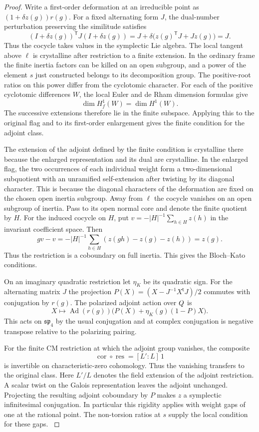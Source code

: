 \begin{proof}
Write a first-order deformation at an
irreducible point as \((1+\delta z(g))r(g)\).
For a fixed alternating form \(J\), the dual-number perturbation preserving the similitude satisfies
\[
 (I+\delta z(g))^{\mathsf T}J(I+\delta z(g))
 =J+\delta\bigl(z(g)^{\mathsf T}J+Jz(g)\bigr)=J .
\]
Thus the cocycle takes values in the symplectic Lie algebra. The local tangent above \(\ell\) is crystalline
after restriction to a finite extension. In the ordinary
frame the finite inertia factors can be killed on an open
subgroup, and a power of the element \(s\) just constructed
belongs to its decomposition group. The positive-root ratios
on this power differ from the cyclotomic character. For each of the positive cyclotomic differences \(W\), the
local Euler and de Rham dimension formulas give
\[
                         \dim H^1_f(W)=\dim H^1(W).
\]
The successive extensions therefore lie in the finite subspace. Applying this to the original flag and
to its first-order enlargement gives the finite condition for
the adjoint class.

The extension of the adjoint defined by
the finite condition is crystalline there because the
enlarged representation and its dual are crystalline. In
the enlarged flag, the two occurrences of each individual
weight form a two-dimensional subquotient with an
unramified self-extension after twisting by its diagonal
character. This is because the diagonal characters of the
deformation are fixed on the chosen open inertia subgroup.
Away from \(\ell\) the cocycle vanishes on an open subgroup of inertia. Pass to its open normal core and denote the finite quotient by \(H\). For the induced cocycle on \(H\), put \(v=-|H|^{-1}\sum_{h\in H}z(h)\) in the invariant coefficient space. Then
\[
 g v-v=-|H|^{-1}\sum_{h\in H}(z(gh)-z(g)-z(h))=z(g).
\]
Thus the restriction is a coboundary on full inertia. This gives the Bloch--Kato conditions.

On an imaginary quadratic restriction let \(\eta_K\) be
its quadratic sign. For the alternating matrix \(J\) the
projection \(P(X)=(X-J^{-1}X^{\mathsf t}J)/2\) commutes with
conjugation by \(r(g)\). The polarized adjoint action over
\(Q\) is
\[
        X\longmapsto
        \operatorname{Ad}(r(g))\big(P(X)+\eta_K(g)(1-P)X\big).
\]
This acts on \(\mathfrak{sp}_4\) by the usual conjugation and
at complex conjugation is negative transpose relative to the
polarizing pairing.

For the finite CM restriction at which the adjoint group
vanishes, the composite
\[
                 \operatorname{cor}\circ\operatorname{res}
                    =[L':L]\,1
\]
is invertible on characteristic-zero cohomology. Thus the
vanishing transfers to the original class. Here \(L'/L\)
denotes the field extension of the adjoint restriction. A scalar twist on
the Galois representation leaves the adjoint unchanged.
Projecting the resulting adjoint coboundary by \(P\) makes
\(z\) a symplectic infinitesimal conjugation. In particular
this rigidity applies with weight gaps of one at the rational
point. The non-torsion ratios at \(s\) supply the local
condition for these gaps.
\hfill\mbox{\cite{thorne-adjoint}}\label{cor:ordinary-symplectic-cohomology-14}


\end{proof}
